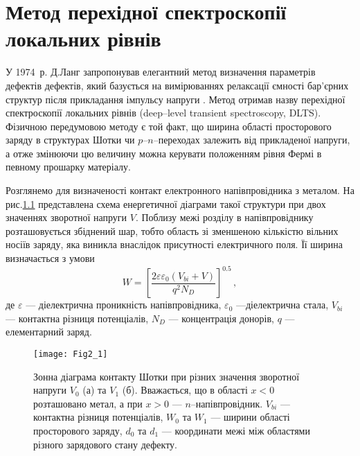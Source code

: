 \chapter{Метод перехідної спектроскопії \\ локальних рівнів}\label{chapDLTS}

У 1974~р. Д.Ланг запропонував елегантний метод визначення параметрів дефектів дефектів,
який базується на вимірюваннях релаксації ємності бар'єрних структур після прикладання
імпульсу напруги \cite{Lang} .
Метод отримав назву перехідної спектроскопії локальних рівнів (deep--level transient spectroscopy, DLTS).
Фізичною передумовою методу є той факт, що ширина області просторового заряду в структурах Шотки чи $p$--$n$--переходах
залежить від прикладеної напруги, а отже змінюючи цю величину можна керувати положенням рівня Фермі в певному
прошарку матеріалу.

Розглянемо для визначеності контакт електронного напівпровідника з металом.
На рис.\ref{F21} представлена схема енергетичної діаграми такої структури при двох значеннях зворотної напруги $V$.
Поблизу межі розділу в напівпровіднику розташовується  збіднений шар,
тобто область зі зменшеною кількістю вільних носіїв заряду, яка виникла
внаслідок присутності електричного поля.
Її ширина визначається з умови
\begin{equation}
W=\left[\frac{2\varepsilon\varepsilon_0(V_{bi}+V)}{q^2N_D}\right]^{0.5}\,,
\end{equation}
де
$\varepsilon$ --- діелектрична проникність напівпровідника,
$\varepsilon_0$ ---діелектрична стала,
$V_{bi}$ --- контактна різниця потенціалів,
$N_D$ --- концентрація донорів,
$q$ --- елементарний заряд.

\begin{figure}[t]
\center
\vspace{-5mm}
\texttt{[image: Fig2\_1]}
\vspace{-3mm}
\caption{Зонна діаграма контакту Шотки при
різних значення зворотної напруги $V_0$ (а) та $V_1$ (б).
Вважається, що в області $x<0$ розташовано метал,
а при  $x>0$ --- $n$--напівпровідник.
$V_{bi}$ --- контактна різниця потенціалів,
$W_0$ та $W_1$ --- ширини області просторового заряду,
$d_0$ та $d_1$ --- координати межі між областями різного зарядового
стану дефекту.
}
\vspace{-3mm}
\label{F21}
\end{figure}

